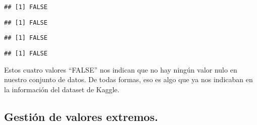\documentclass[
]{article}
\newenvironment{Shaded}{\begin{snugshade}}{\end{snugshade}}
\newcommand{\FunctionTok}[1]{\textcolor[rgb]{0.94,0.94,0.56}{#1}}
\newcommand{\NormalTok}[1]{\textcolor[rgb]{0.80,0.80,0.80}{#1}}
\newcommand{\SpecialCharTok}[1]{\textcolor[rgb]{0.86,0.64,0.64}{#1}}
\begin{document}
\begin{Shaded}
\end{Shaded}

\begin{verbatim}
## [1] FALSE
\end{verbatim}

\begin{Shaded}
\end{Shaded}

\begin{verbatim}
## [1] FALSE
\end{verbatim}

\begin{Shaded}
\end{Shaded}

\begin{verbatim}
## [1] FALSE
\end{verbatim}

\begin{Shaded}
\end{Shaded}

\begin{verbatim}
## [1] FALSE
\end{verbatim}

Estos cuatro valores ``FALSE'' nos indican que no hay ningún valor nulo
en nuestro conjunto de datos. De todas formas, eso es algo que ya nos
indicaban en la información del dataset de Kaggle.

\hypertarget{gestiuxf3n-de-valores-extremos.}{%
\subsection{Gestión de valores
extremos.}\label{gestiuxf3n-de-valores-extremos.}}
\end{document}
